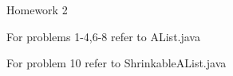 \documentclass[10pt]{article}
\begin{document}
	\begin{center}
		Homework 2
	\end{center}
	
	For problems 1-4,6-8 refer to AList.java
	
	For problem 10 refer to ShrinkableAList.java
\end{document}
